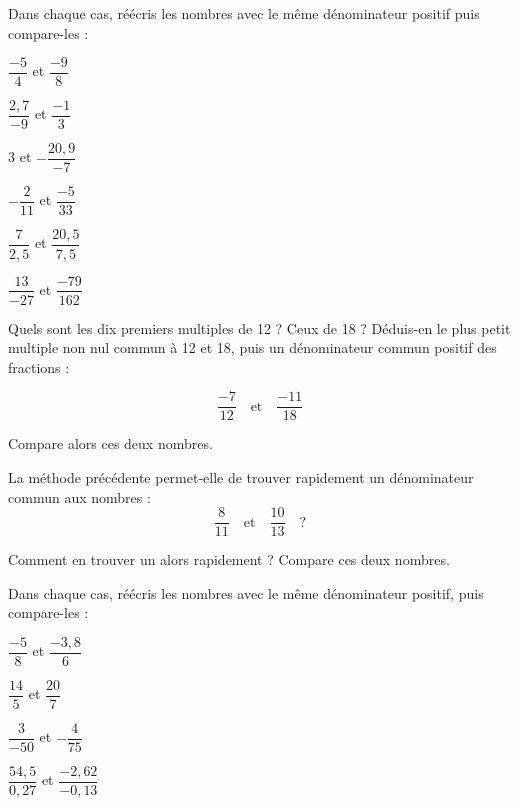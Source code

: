 \begin{exercice}

Dans chaque cas, réécris les nombres avec le même dénominateur positif puis compare-les :

\begin{colenumerate}{2} 
\item $\dfrac{-5}{4}$ et $\dfrac{-9}{8}$ 
\item $\dfrac{2,7}{-9}$ et $\dfrac{-1}{3}$ 
\item 3 et $-\dfrac{20,9}{-7}$ 
\item $-\dfrac{2}{11}$ et $\dfrac{-5}{33}$ 
\item $\dfrac{7}{2,5}$ et $\dfrac{20,5}{7,5}$ 
\item $\dfrac{13}{-27}$ et $\dfrac{-79}{162}$
\end{colenumerate} 
\end{exercice}

\begin{exercice}

\begin{colenumerate}{1} 
\item Quels sont les dix premiers multiples de 12 ? Ceux de 18 ? Déduis-en le plus petit multiple non nul commun à 12 et 18, puis un dénominateur commun positif des fractions :

\[ \dfrac{-7}{12} \quad \text{et} \quad \dfrac{-11}{18} \]

Compare alors ces deux nombres.

\item La méthode précédente permet-elle de trouver rapidement un dénominateur commun aux nombres :
\[ \dfrac{8}{11} \quad \text{et} \quad \dfrac{10}{13} \quad \text{?} \]

Comment en trouver un alors rapidement ? Compare ces deux nombres.
\end{colenumerate} 
\end{exercice}

\begin{exercice}

Dans chaque cas, réécris les nombres avec le même dénominateur positif, puis compare-les :

\begin{colenumerate}{2}
\item $\dfrac{-5}{8}$ et $\dfrac{-3,8}{6}$ 
\item $\dfrac{14}{5}$ et $\dfrac{20}{7}$ 
\item $\dfrac{3}{-50}$ et $-\dfrac{4}{75}$ 
\item $\dfrac{54,5}{0,27}$ et $\dfrac{-2,62}{-0,13}$
\end{colenumerate} 
\end{exercice}

